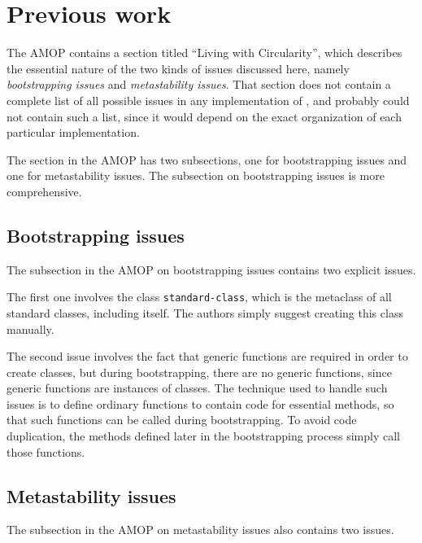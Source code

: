 \section{Previous work}

The AMOP \cite{Kiczales:1991:AMP:574212} contains a section titled
``Living with Circularity'', which describes the essential nature of
the two kinds of issues discussed here, namely \emph{bootstrapping
  issues} and \emph{metastability issues}.  That section does not
contain a complete list of all possible issues in any implementation
of \clos{}, and probably could not contain such a list, since it would
depend on the exact organization of each particular implementation.

The section in the AMOP has two subsections, one for bootstrapping
issues and one for metastability issues.  The subsection on
bootstrapping issues is more comprehensive.

\subsection{Bootstrapping issues}

The subsection in the AMOP on bootstrapping issues contains two explicit
issues.

The first one involves the class \texttt{standard-class}, which is the
metaclass of all standard classes, including itself.  The authors
simply suggest creating this class manually.

The second issue involves the fact that generic functions are required
in order to create classes, but during bootstrapping, there are no
generic functions, since generic functions are instances of classes.
The technique used to handle such issues is to define ordinary
functions to contain code for essential methods, so that such
functions can be called during bootstrapping.  To avoid code
duplication, the methods defined later in the bootstrapping process
simply call those functions.

\subsection{Metastability issues} 

The subsection in the AMOP on metastability issues also contains two
issues.

